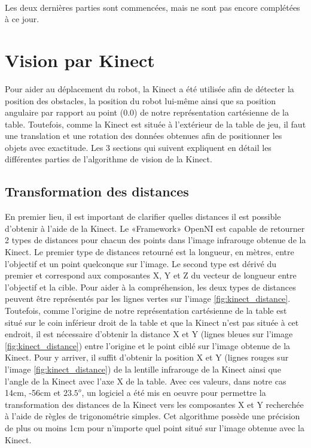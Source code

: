 \paragraph{}Les deux dernières parties sont commencées, mais ne sont pas encore complétées à ce jour.


\section{Vision par Kinect}
Pour aider au déplacement du robot, la Kinect a été utilisée afin de détecter la position des obstacles, la position du robot lui-même ainsi que sa position angulaire par rapport au point (0.0) de notre représentation cartésienne de la table. Toutefois, comme la Kinect est située à l'extérieur de la table de jeu, il faut une translation et une rotation des données obtenues afin de positionner les objets avec exactitude. Les 3 sections qui suivent expliquent en détail les différentes parties de l'algorithme de vision de la Kinect.

\subsection{Transformation des distances}
En premier lieu, il est important de clarifier quelles distances il est possible d'obtenir à l'aide de la Kinect. Le «Framework» OpenNI est capable de retourner 2 types de distances pour chacun des points dans l'image infrarouge obtenue de la Kinect. Le premier type de distances retourné est la longueur, en mètres, entre l'objectif et un point quelconque sur l'image. Le second type est dérivé du premier et correspond aux composantes X, Y et Z du vecteur de longueur entre l'objectif et la cible. Pour aider à la compréhension, les deux types de distances peuvent être représentés par les lignes vertes sur l'image \ref{fig:kinect_distance}. Toutefois, comme l'origine de notre représentation cartésienne de la table est situé sur le coin inférieur droit de la table et que la Kinect n'est pas située à cet endroit, il est nécessaire d'obtenir la distance X et Y (lignes bleues sur l'image \ref{fig:kinect_distance}) entre l'origine et le point ciblé sur l'image obtenue de la Kinect. Pour y arriver, il suffit d'obtenir la position X et Y (lignes rouges sur l'image \ref{fig:kinect_distance}) de la lentille infrarouge de la Kinect ainsi que l'angle de la Kinect avec l'axe X de la table. Avec ces valeurs, dans notre cas 14cm, -56cm et $23.5^o$, un logiciel a été mis en oeuvre pour permettre la transformation des distances de la Kinect vers les composantes X et Y recherchée à l'aide de règles de trigonométrie simples. Cet algorithme possède une précision de plus ou moins 1cm pour n'importe quel point situé sur l'image obtenue avec la Kinect. 

